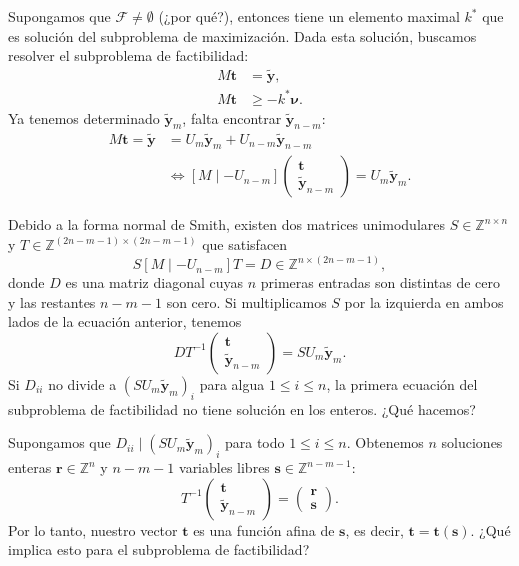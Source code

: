 \documentclass[aspectratio=169,professionalfonts]{beamer}
\newcommand{\Z}{\mathbb{Z}}
\renewcommand{\vec}[1]{\boldsymbol{#1}}
\newcommand{\inv}[1]{#1^{-1}}
\newcommand{\tvec}[1]{\vec{\tilde{#1}}}
\begin{document}
\begin{frame}
	Supongamos que $\mathcal{F} \neq \emptyset$ (¿por qué?), entonces tiene un
	elemento maximal $k^*$ que es solución del subproblema de maximización. Dada
	esta solución, buscamos resolver el subproblema de factibilidad:
	\begin{subequations}
		\begin{align*}
			M\vec{t} &= \tvec{y}, \\
			M\vec{t} &\geq -k^*\vec{\nu}.
		\end{align*}
	\end{subequations}
	Ya tenemos determinado $\tvec{y}_m$, falta encontrar $\tvec{y}_{n-m}$:
	\begin{align*}
		M\vec{t} = \tvec{y} &= U_m\tvec{y}_m + U_{n-m}\tvec{y}_{n-m} \nonumber \\
	   &\iff [M \mid -U_{n-m}] \begin{pmatrix} \vec{t} \\ \tvec{y}_{n-m} \end{pmatrix} = U_m\tvec{y}_m.
	\end{align*}
\end{frame}

\begin{frame}
	Debido a la forma normal de Smith, existen dos matrices unimodulares $S
	\in \Z^{n \times n}$ y $T \in \Z^{(2n - m - 1) \times (2n - m -1)}$ que
	satisfacen
\begin{equation*}
	S[M \mid -U_{n-m}]T = D \in \Z^{n \times (2n - m - 1)},
\end{equation*}
	donde $D$ es una matriz diagonal cuyas $n$ primeras entradas son distintas de
	cero y las restantes $n - m - 1$ son cero. Si multiplicamos $S$ por la izquierda
	en ambos lados de la ecuación anterior, tenemos
	\begin{equation*}
		D\inv{T}\begin{pmatrix} \vec{t} \\ \tvec{y}_{n-m} \end{pmatrix}
		= SU_m\tvec{y}_{m}.
	\end{equation*}
	Si $D_{ii}$ no divide a $(SU_m\tvec{y}_m)_i$ para algua $1 \leq i \leq n$,
	la primera ecuación del subproblema de factibilidad no tiene solución en los
	enteros. ¿Qué hacemos?
\end{frame}

\begin{frame}
	Supongamos que $D_{ii} \mid (SU_m\tvec{y}_m)_i$ para todo $1 \leq i \leq n$.
	Obtenemos $n$ soluciones enteras $\vec{r} \in \Z^n$ y $n - m - 1$ variables
	libres $\vec{s} \in \Z^{n-m-1}$:
	\begin{equation*}
		\inv{T}\begin{pmatrix} \vec{t} \\ \tvec{y}_{n-m} \end{pmatrix}
		=
		\begin{pmatrix} \vec{r} \\ \vec{s} \end{pmatrix}.
	\end{equation*}
	Por lo tanto, nuestro vector $\vec{t}$ es una función afina de $\vec{s}$, es
	decir, $\vec{t} = \vec{t}(\vec{s})$. ¿Qué implica esto para el subproblema
	de factibilidad?
\end{frame}
\end{document}
